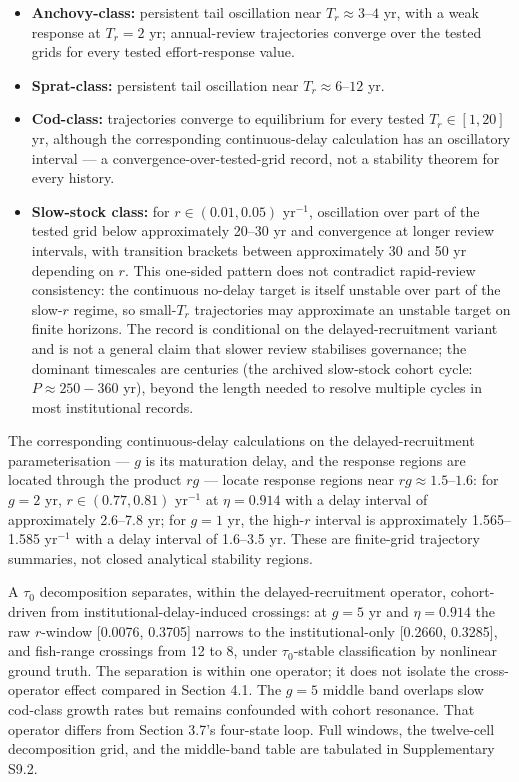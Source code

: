 \documentclass[11pt]{article}
\providecommand{\tightlist}{\setlength{\itemsep}{0pt}\setlength{\parskip}{0pt}}
\begin{document}
\begin{itemize}
\tightlist
\item
  \textbf{Anchovy-class:} persistent tail oscillation near
  \(T_r\approx 3\)--\(4\) yr, with a weak response at \(T_r=2\) yr;
  annual-review trajectories converge over the tested grids for every
  tested effort-response value.
\item
  \textbf{Sprat-class:} persistent tail oscillation near
  \(T_r\approx 6\)--\(12\) yr.
\item
  \textbf{Cod-class:} trajectories converge to equilibrium for every
  tested \(T_r\in[1,20]\) yr, although the corresponding
  continuous-delay calculation has an oscillatory interval --- a
  convergence-over-tested-grid record, not a stability theorem for every
  history.
\item
  \textbf{Slow-stock class:} for \(r\in(0.01,0.05)\) yr\(^{-1}\),
  oscillation over part of the tested grid below approximately 20--30 yr
  and convergence at longer review intervals, with transition brackets
  between approximately 30 and 50 yr depending on \(r\). This one-sided
  pattern does not contradict rapid-review consistency: the continuous
  no-delay target is itself unstable over part of the slow-\(r\) regime,
  so small-\(T_r\) trajectories may approximate an unstable target on
  finite horizons. The record is conditional on the delayed-recruitment
  variant and is not a general claim that slower review stabilises
  governance; the dominant timescales are centuries (the archived slow-stock cohort cycle: \(P \approx 250{-}360\) yr), beyond the length
  needed to resolve multiple cycles in most institutional records.
\end{itemize}

The corresponding continuous-delay calculations on the
delayed-recruitment parameterisation --- \(g\) is its maturation delay,
and the response regions are located through the product \(rg\) ---
locate response regions near \(rg\approx 1.5\)--\(1.6\): for \(g=2\) yr,
\(r\in(0.77,0.81)\) yr\(^{-1}\) at \(\eta=0.914\) with a delay interval
of approximately 2.6--7.8 yr; for \(g=1\) yr, the high-\(r\) interval is
approximately 1.565--1.585 yr\(^{-1}\) with a delay interval of 1.6--3.5
yr. These are finite-grid trajectory summaries, not closed analytical
stability regions.

A \(\tau_0\) decomposition separates, within the delayed-recruitment
operator, cohort-driven from institutional-delay-induced crossings: at
\(g = 5\) yr and \(\eta = 0.914\) the raw \(r\)-window [0.0076, 0.3705]
narrows to the institutional-only [0.2660, 0.3285], and fish-range
crossings from 12 to 8, under \(\tau_0\)-stable classification by
nonlinear ground truth. The separation is within one operator; it does
not isolate the cross-operator effect compared in Section 4.1. The
\(g = 5\) middle band overlaps slow cod-class growth rates but remains
confounded with cohort resonance. That operator differs from Section
3.7's four-state loop. Full windows, the twelve-cell decomposition grid,
and the middle-band table are tabulated in Supplementary S9.2.
\end{document}
